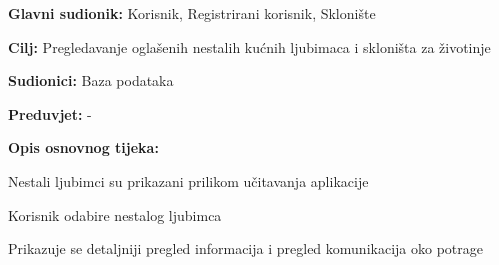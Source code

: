 					\noindent {}
					\begin{packed_item}
	
						\item \textbf{Glavni sudionik: }Korisnik, Registrirani korisnik, Sklonište
						\item  \textbf{Cilj:} Pregledavanje oglašenih nestalih kućnih ljubimaca i skloništa za životinje
						\item  \textbf{Sudionici:} Baza podataka
						\item  \textbf{Preduvjet:} -
						\item  \textbf{Opis osnovnog tijeka:}
						
						\item[] \begin{packed_enum}
	
							\item Nestali ljubimci su prikazani prilikom učitavanja aplikacije
							\item Korisnik odabire nestalog ljubimca
							\item Prikazuje se detaljniji pregled informacija i pregled komunikacija oko potrage
						\end{packed_enum}
						
					\end{packed_item}
				
